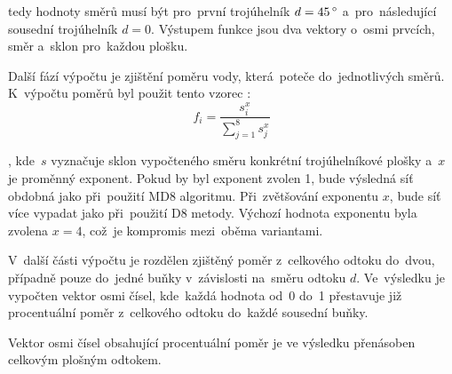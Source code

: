 tedy hodnoty směrů musí být pro~první trojúhelník $d = 45\,^{\circ}{\rm}$ a~pro~následující sousední trojúhelník $d = 0$. Výstupem funkce jsou dva vektory o~osmi prvcích, směr a~sklon pro~každou plošku.
\par Další fází výpočtu je zjištění poměru vody, která~poteče do~jednotlivých směrů. K~výpočtu poměrů byl použit tento vzorec \cite{holmgren}:
\begin{equation}
 f_i = \frac{s_i^x}{\sum\limits_{j=1}^8 s_j^x} \label{eq:proportions}
\end{equation}
\par , kde~$s$ vyznačuje sklon vypočteného směru konkrétní trojúhelníkové plošky a~$x$ je proměnný exponent. Pokud by byl exponent zvolen 1, bude výsledná síť obdobná jako při~použití MD8 algoritmu.
Při~zvětšování exponentu $x$, bude síť více vypadat jako při~použití D8 metody. Výchozí hodnota exponentu byla zvolena $x=4$, což~je kompromis mezi~oběma variantami.
\par V~další části výpočtu je rozdělen zjištěný poměr z~celkového odtoku do~dvou, případně pouze do~jedné buňky v~závislosti na~směru odtoku $d$. Ve~výsledku je vypočten vektor osmi čísel, 
kde~každá hodnota od~0 do~1 přestavuje již procentuální poměr z~celkového odtoku do~každé sousední buňky.
\par Vektor osmi čísel obsahující procentuální poměr je ve výsledku přenásoben celkovým plošným odtokem. 

